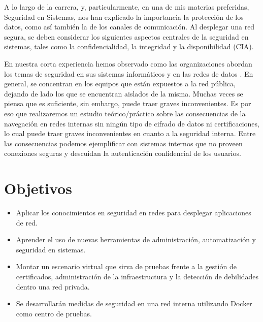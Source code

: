 %


A lo largo de la carrera, y, particularmente, en una de mis materias preferidas,  
Seguridad en Sistemas, nos han explicado la importancia la protección de los 
datos, como así también la de los canales de comunicación. Al desplegar 
una red segura, se deben considerar los siguientes aspectos centrales de la 
seguridad en sistemas, tales como la confidencialidad, la integridad y la disponibilidad 
(CIA). 

En nuestra corta experiencia hemos observado como las organizaciones 
abordan los temas de seguridad en sus sistemas informáticos y en las redes de 
datos . En general, se 
concentran en los equipos que están expuestos a la red pública, dejando de 
lado los que se encuentran aislados de la misma. Muchas veces 
se piensa que es suficiente, sin embargo, puede traer graves inconvenientes. 
Es por eso que realizaremos un estudio teórico/práctico sobre las consecuencias 
de la navegación en redes internas sin ningún tipo de cifrado de datos ni 
certificaciones, lo cual puede traer graves inconvenientes en cuanto a la 
seguridad interna. Entre las consecuencias podemos ejemplificar con sistemas 
internos que no proveen conexiones seguras y descuidan la autenticación 
confidencial de los usuarios.


\section{Objetivos}

\begin{itemize}
    \setlength\itemsep{-0.6em}
    \item Aplicar los conocimientos en seguridad en redes para desplegar aplicaciones de red.
    \item Aprender el uso de nuevas herramientas de administración, automatización y seguridad en sistemas.
    \item Montar un escenario virtual que sirva de pruebas frente a la gestión de certificados, 
    administración de la infraestructura y la detección de debilidades dentro una red privada.
    \item Se desarrollarán medidas de seguridad en una red interna utilizando Docker como centro de 
    pruebas.
\end{itemize}



